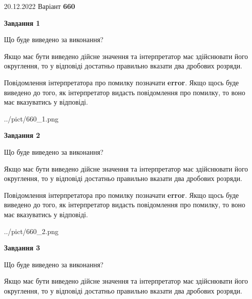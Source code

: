 \documentclass[12pt, ukrainian]{article}
\begin{document}
{20.12.2022 Варіант \No \textbf { 660 }\par}
{
\begin {Large}

{\begin {center}\textbf{Завдання 1}\end {center}}\par
Що буде виведено за виконання? \par

Якщо має бути виведено дійсне значення та інтерпретатор має здійснювати його округлення, 
то у відповіді достатньо правильно вказати два дробових розряди.

Повідомлення інтерпретатора про помилку позначати \textbf{error}.
Якщо щось буде виведено до того, як інтерпретатор видасть повідомлення про помилку, 
то воно має вказуватись у відповіді. \par

\begin{center}
	{../pict/660_1.png}
\end{center}
\newpage

{\begin {center}\textbf{Завдання 2}\end {center}}\par
Що буде виведено за виконання? \par

Якщо має бути виведено дійсне значення та інтерпретатор має здійснювати його округлення, 
то у відповіді достатньо правильно вказати два дробових розряди.

Повідомлення інтерпретатора про помилку позначати \textbf{error}.
Якщо щось буде виведено до того, як інтерпретатор видасть повідомлення про помилку, 
то воно має вказуватись у відповіді. \par

\begin{center}
	{../pict/660_2.png}
\end{center}
\newpage

{\begin {center}\textbf{Завдання 3}\end {center}}\par
Що буде виведено за виконання? \par

Якщо має бути виведено дійсне значення та інтерпретатор має здійснювати його округлення, 
то у відповіді достатньо правильно вказати два дробових розряди.


\end{Large}}
\end{document}
